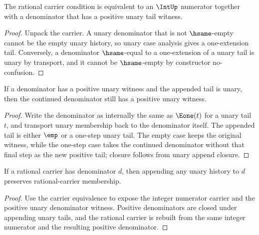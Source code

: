 \begin{theorem}
\label{thm:rat-carrier-iff-positive-unary-denominator}
The rational carrier condition is equivalent to an $\IntUp$ numerator together with a denominator that has a positive unary tail witness.
\end{theorem}
\begin{proof}
Unpack the carrier. A unary denominator that is not $\hsame$-empty cannot be the empty unary history, so unary case analysis gives a one-extension tail. Conversely, a denominator $\hsame$-equal to a one-extension of a unary tail is unary by transport, and it cannot be $\hsame$-empty by constructor no-confusion.
\end{proof}

\begin{theorem}
\label{thm:rat-positive-denominator-append-unary-tail}
If a denominator has a positive unary witness and the appended tail is unary, then the continued denominator still has a positive unary witness.
\end{theorem}
\begin{proof}
Write the denominator as internally the same as $\Eone(t)$ for a unary tail $t$, and transport unary membership back to the denominator itself. The appended tail is either $\emp$ or a one-step unary tail. The empty case keeps the original witness, while the one-step case takes the continued denominator without that final step as the new positive tail; closure follows from unary append closure.
\end{proof}

\begin{theorem}
\label{thm:rat-carrier-append-unary-denominator-closed}
If a rational carrier has denominator $d$, then appending any unary history to
$d$ preserves rational-carrier membership.
\end{theorem}
\begin{proof}
Use the carrier equivalence to expose the integer numerator carrier and the
positive unary denominator witness. Positive denominators are closed under
appending unary tails, and the rational carrier is rebuilt from the same
integer numerator and the resulting positive denominator.
\end{proof}

